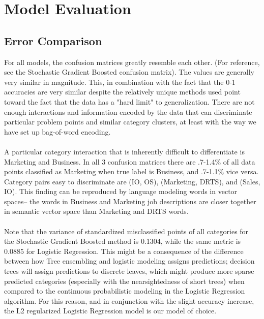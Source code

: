 \documentclass[9.5 pt]{article}
\begin{document}
\section{Model Evaluation }

\subsection{Error Comparison}

For all models, the confusion matrices greatly resemble each other. (For reference, see the Stochastic Gradient Boosted confusion matrix). The values are generally very similar in magnitude. This, in combination with the fact that the 0-1 accuracies are very similar despite the relatively unique methods used point toward the fact that the data has a "hard limit" to generalization. There are not enough interactions and information encoded by the data that can discriminate particular problem points and similar category clusters, at least with the way we have set up bag-of-word encoding. \\ \\
A particular category interaction that is inherently difficult to differentiate is Marketing and Business. In all 3 confusion matrices there are .7-1.4\% of all data points classified as Marketing when true label is Business, and .7-1.1\% vice versa. Category pairs easy to discriminate are (IO, OS), (Marketing, DRTS), and (Sales, IO). This finding can be reproduced by language modeling words in vector spaces-- the words in Business and Marketing job descriptions are closer together in semantic vector space than Marketing and DRTS words. \\ \\
Note that the variance of standardized misclassified points of all categories for the Stochastic Gradient Boosted method is 0.1304, while the same metric is 0.0885 for Logistic Regression. This might be a consequence of the difference between how Tree ensembling and logistic modeling assigns predictions; decision trees will assign predictions to discrete leaves, which might produce more sparse predicted categories (especially with the nearsightedness of short trees) when compared to the continuous probabilistic modeling in the Logistic Regression algorithm. For this reason, and in conjunction with the slight accuracy increase, the L2 regularized Logistic Regression model is our model of choice.
\end{document}
